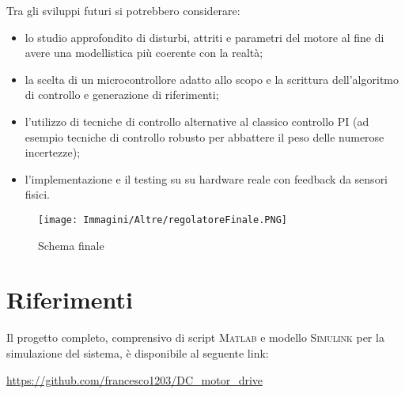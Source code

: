 \documentclass[a4paper,12pt]{article}
\begin{document}
\bigskip

Tra gli sviluppi futuri si potrebbero considerare:

\begin{itemize}
    \item lo studio approfondito di disturbi, attriti e parametri del motore al fine di avere una modellistica più coerente con la realtà;
    \item la scelta di un microcontrollore adatto allo scopo e la scrittura dell'algoritmo di controllo e generazione di riferimenti; 
    \item l'utilizzo di tecniche di controllo alternative al classico controllo PI (ad esempio tecniche di controllo robusto per abbattere il peso delle numerose incertezze);
    \item l’implementazione e il testing su su hardware reale con feedback da sensori fisici.
\end{itemize}

\bigskip


\begin{figure}[h!]
    \centering
    \texttt{[image: Immagini/Altre/regolatoreFinale.PNG]}
    \caption{Schema finale}
    \label{fig: modelloFinale}
\end{figure}

\vspace{0.5cm}


\newpage

\section*{Riferimenti}

Il progetto completo, comprensivo di script \textsc{Matlab} e modello \textsc{Simulink} per la simulazione del sistema, è disponibile al seguente link:

\vspace{0.5cm}

\url{https://github.com/francesco1203/DC_motor_drive}
\end{document}
